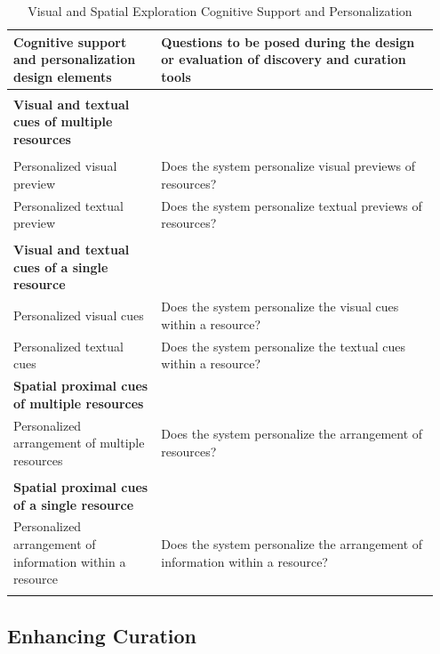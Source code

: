 \documentclass{sigchi}
\begin{document}
{{{\begin{table}[ht!]
\caption{Visual and Spatial Exploration Cognitive Support and Personalization}
\label{table:exploration_support}
\begin{tabular}{| p{0.33\linewidth}|p{0.62\linewidth}|}
\hline
Cognitive support and personalization design elements & Questions to be posed during the design or evaluation of discovery and curation tools  \\
\hline
 &\\
\textbf{Visual and textual cues of multiple resources} & \\
&\\
Personalized visual preview  & Does the system personalize visual previews of resources? \\
Personalized textual preview & Does the system personalize textual previews of resources? \\
& \\
\textbf{Visual and textual cues of a single resource} & \\
Personalized visual cues                 & Does the system personalize the visual cues within a resource? \\
Personalized textual cues                & Does the system personalize the textual cues within a resource? \\
\textbf{Spatial proximal cues of multiple resources} & \\
Personalized arrangement of multiple resources & Does the system personalize the arrangement of resources? \\  
& \\                                                  
\textbf{Spatial proximal cues of a single resource} & \\
Personalized arrangement of information within a resource          & Does the system personalize the arrangement of information within a resource? \\                                                       
& \\
\hline
\end{tabular}
\end{table}
} %

{\subsection{Enhancing Curation}

}}}
\end{document}
